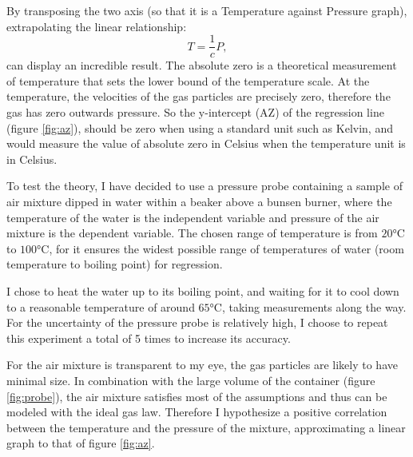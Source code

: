 \documentclass[a4paper,12pt]{article}
\begin{document}
By transposing the two axis (so that it is a Temperature against Pressure graph), extrapolating the linear relationship:
\[
    T = \frac{1}{c}P,
\]
can display an incredible result. The absolute zero is a theoretical measurement of temperature that sets the lower bound of the temperature scale. At the temperature, the velocities of the gas particles are precisely zero, therefore the gas has zero outwards pressure. So the y-intercept (AZ) of the regression line (figure \ref{fig:az}), should be zero when using a standard unit such as Kelvin, and would measure the value of absolute zero in Celsius when the temperature unit is in Celsius.




To test the theory, I have decided to use a pressure probe containing a sample of air mixture dipped in water within a beaker above a bunsen burner, where the temperature of the water is the independent variable and pressure of the air mixture is the dependent variable. The chosen range of temperature is from $20\si{\celsius}$ to $100\si{\celsius}$, for it ensures the widest possible range of temperatures of water (room temperature to boiling point) for regression.

I chose to heat the water up to its boiling point, and waiting for it to cool down to a reasonable temperature of around $65\si{\celsius}$, taking measurements along the way. For the uncertainty of the pressure probe is relatively high, I choose to repeat this experiment a total of 5 times to increase its accuracy.

For the air mixture is transparent to my eye, the gas particles are likely to have minimal size. In combination with the large volume of the container (figure \ref{fig:probe}), the air mixture satisfies most of the assumptions and thus can be modeled with the ideal gas law. Therefore I hypothesize a positive correlation between the temperature and the pressure of the mixture, approximating a linear graph to that of figure \ref{fig:az}.
\end{document}
